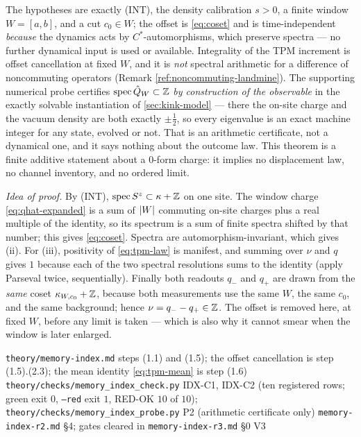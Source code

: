 \begin{scope}
The hypotheses are exactly (INT), the density calibration $s>0$, a finite
window $W=[a,b]$, and a cut $c_0\in W$; the offset is
\eqref{eq:coset} and is time-independent \emph{because} the dynamics acts by
$C^*$-automorphisms, which preserve spectra --- no further dynamical input is
used or available. Integrality of the TPM increment is offset cancellation at
fixed $W$, and it is \emph{not} spectral arithmetic for a difference of
noncommuting operators (Remark \ref{ref:noncommuting-landmine}). The
supporting numerical probe certifies $\operatorname{spec}\hat{Q}_W\subset\mathbb{Z}$ \emph{by
construction of the observable} in the exactly solvable instantiation of
\cref{sec:kink-model} --- there the on-site charge and the vacuum density are
both exactly $\pm\tfrac12$, so every eigenvalue is an exact machine integer
for any state, evolved or not. That is an arithmetic certificate, not a
dynamical one, and it says nothing about the outcome law. This theorem is a
finite additive statement about a $0$-form charge: it implies no displacement
law, no channel inventory, and no ordered limit.
\end{scope}

\emph{Idea of proof.} By (INT), $\operatorname{spec} S^z\subset\kappa+\mathbb{Z}$ on one site. The
window charge \eqref{eq:qhat-expanded} is a sum of $\lvert W\rvert$ commuting on-site
charges plus a real multiple of the identity, so its spectrum is a sum of
finite spectra shifted by that number; this gives \eqref{eq:coset}. Spectra
are automorphism-invariant, which gives (ii). For (iii), positivity of
\eqref{eq:tpm-law} is manifest, and summing over $\nu$ and $q$ gives $1$
because each of the two spectral resolutions sums to the identity (apply
Parseval twice, sequentially). Finally both readouts $q_-$ and $q_+$ are
drawn from the \emph{same} coset $\kappa_{W,c_0}+\mathbb{Z}$, because both
measurements use the same $W$, the same $c_0$, and the same background; hence
$\nu=q_--q_+\in\mathbb{Z}$. The offset is removed here, at fixed $W$, before any
limit is taken --- which is also why it cannot smear when the window is later
enlarged.

{\texttt{theory/memory-index.md} steps (1.1) and (1.5); the offset
 cancellation is step (1.5).(2.3); the mean identity \eqref{eq:tpm-mean} is
 step (1.6)}
{\texttt{theory/checks/memory\_index\_check.py} IDX-C1, IDX-C2 (ten
 registered rows; green exit $0$, \texttt{--red} exit $1$, RED-OK $10$ of
 $10$); \texttt{theory/checks/memory\_index\_probe.py} P2 (arithmetic
 certificate only)}
{\texttt{memory-index-r2.md} \S4; gates cleared in
 \texttt{memory-index-r3.md} \S0 V3}

